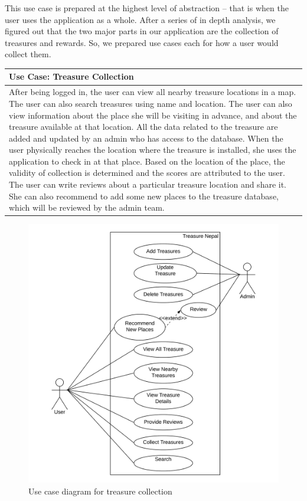 \documentclass[12pt, a4paper, oneside]{article}
\begin{document}
\vspace{200px}
This use case is prepared at the highest level of abstraction -- that is when the user uses the application as a whole. After a series of in depth analysis, we figured out that the two major parts in our application are the collection of treasures and rewards. So, we prepared use cases each for how a user would collect them.

\begin{table}[h!]
\centering
\begin{tabularx}{\linewidth}{|X|} 
\hline
\textbf{Use Case:  Treasure Collection}\\ 
\hline
After being logged in, the user can view all nearby treasure locations in a map. The user can also search treasures using name and location.  The user can also view information about the place she will be visiting in advance, and about the treasure available at that location. All the data related to the treasure are added and updated by an admin who has access to the database. When the user physically reaches the location where the treasure is installed, she uses the application to check in at that place. Based on the location of the place, the validity of collection is determined and the scores are attributed to the user. The user can write reviews about a particular treasure location and share it. She can also recommend to add some new places to the treasure database, which will be reviewed by the admin team.\\
\hline
\end{tabularx}
\end{table}

\begin{figure}[H]
\includegraphics[width=\linewidth]{use-case-diagrams/treasure.png}
\centering
\caption{Use case diagram for treasure collection}
\label{fig:use-case-treasure}
\end{figure}
\end{document}
